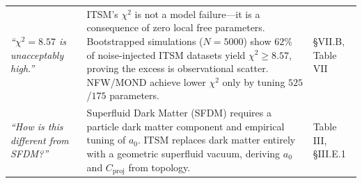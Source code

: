 \documentclass[aps,prd,10pt,twocolumn,superscriptaddress,nofootinbib,floatfix]{revtex4-2}
\begin{document}
\begin{table}[htbp]
\begin{tabular}{p{} p{} p{}}
\textit{``$\chi^2 = 8.57$ is unacceptably high.''} & ITSM's $\chi^2$ is not a model failure---it is a consequence of zero local free parameters. Bootstrapped simulations ($N = 5000$) show $62\%$ of noise-injected ITSM datasets yield $\chi^2 \ge 8.57$, proving the excess is observational scatter. NFW/MOND achieve lower $\chi^2$ only by tuning $525$/$175$ parameters. & \S VII.B, Table VII \\
\textit{``How is this different from SFDM?''} & Superfluid Dark Matter (SFDM) requires a particle dark matter component \cite{sf_dm} and empirical tuning of $a_0$. ITSM replaces dark matter entirely with a geometric superfluid vacuum, deriving $a_0$ and $C_{\text{proj}}$ from topology. & Table III, \S III.E.1 \\
\bottomrule
\end{tabular}
\end{table}


\clearpage


\end{document}
